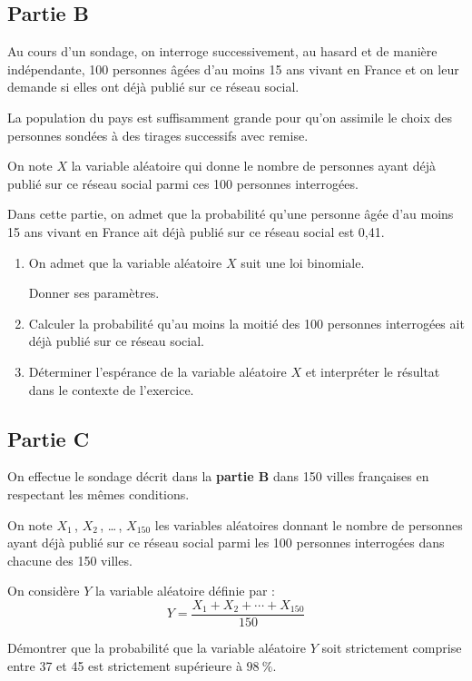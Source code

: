 \subsection*{Partie B}
Au cours d'un sondage, on interroge successivement, au hasard et de manière indépendante, 100 personnes âgées d'au moins 15 ans vivant en France et on leur demande si elles ont déjà publié sur ce réseau social.

La population du pays est suffisamment grande pour qu'on assimile le choix des personnes sondées à des tirages successifs avec remise.

On note $X$ la variable aléatoire qui donne le nombre de personnes ayant déjà publié sur ce réseau social parmi ces 100 personnes interrogées.

Dans cette partie, on admet que la probabilité qu'une personne âgée d'au moins 15 ans vivant en France ait déjà publié sur ce réseau social est 0,41.

\begin{enumerate}
	\item On admet que la variable aléatoire $X$ suit une loi binomiale.

	Donner ses paramètres.

	\item Calculer la probabilité qu'au moins la moitié des 100 personnes interrogées ait déjà publié sur ce réseau social.

	\item Déterminer l'espérance de la variable aléatoire $X$ et interpréter le résultat dans le contexte de l'exercice.
\end{enumerate}

\subsection*{Partie C}
On effectue le sondage décrit dans la \textbf{partie B} dans 150 villes françaises en respectant les mêmes conditions.

On note $X_{1}$\,, $X_{2}$\,, \ldots\,, $X_{150}$ les variables aléatoires donnant le nombre de personnes ayant déjà publié sur ce réseau social parmi les 100 personnes interrogées dans chacune des 150 villes.

On considère $Y$ la variable aléatoire définie par :
\[Y=\dfrac{X_{1}+X_{2}+\cdots+X_{150}}{150}\]

Démontrer que la probabilité que la variable aléatoire $Y$ soit strictement comprise entre 37 et 45 est strictement supérieure à $98~\%$.
